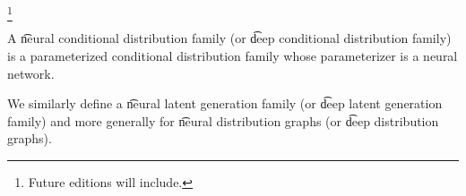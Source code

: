 
\footnote{Future editions will include.}


A \t{neural conditional distribution family} (or \t{deep conditional distribution family}) is a parameterized conditional distribution family whose parameterizer is a neural network.

We similarly define a \t{neural latent generation family} (or \t{deep latent generation family}) and more generally for \t{neural distribution graphs} (or \t{deep distribution graphs}).

\blankpage
